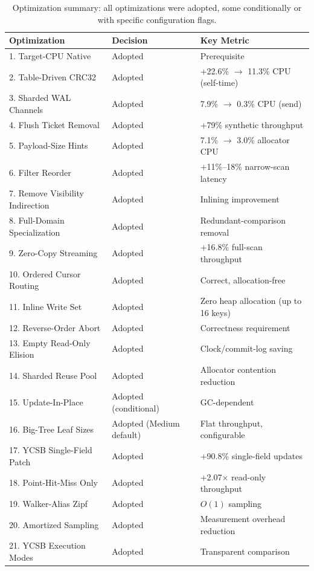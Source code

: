 \documentclass[11pt]{article}
\begin{document}
\begin{table}[h]
\centering
\small
\begin{tabular}{lll}
\toprule
\textbf{Optimization} & \textbf{Decision} & \textbf{Key Metric} \\
\midrule
1. Target-CPU Native & Adopted & Prerequisite \\
2. Table-Driven CRC32 & Adopted & +22.6\% $\to$ 11.3\% CPU (self-time) \\
3. Sharded WAL Channels & Adopted & 7.9\% $\to$ 0.3\% CPU (send) \\
4. Flush Ticket Removal & Adopted & +79\% synthetic throughput \\
5. Payload-Size Hints & Adopted & 7.1\% $\to$ 3.0\% allocator CPU \\
6. Filter Reorder & Adopted & +11\%--18\% narrow-scan latency \\
7. Remove Visibility Indirection & Adopted & Inlining improvement \\
8. Full-Domain Specialization & Adopted & Redundant-comparison removal \\
9. Zero-Copy Streaming & Adopted & +16.8\% full-scan throughput \\
10. Ordered Cursor Routing & Adopted & Correct, allocation-free \\
11. Inline Write Set & Adopted & Zero heap allocation (up to 16 keys) \\
12. Reverse-Order Abort & Adopted & Correctness requirement \\
13. Empty Read-Only Elision & Adopted & Clock/commit-log saving \\
14. Sharded Reuse Pool & Adopted & Allocator contention reduction \\
15. Update-In-Place & Adopted (conditional) & GC-dependent \\
16. Big-Tree Leaf Sizes & Adopted (Medium default) & Flat throughput, configurable \\
17. YCSB Single-Field Patch & Adopted & +90.8\% single-field updates \\
18. Point-Hit-Miss Only & Adopted & +2.07$\times$ read-only throughput \\
19. Walker-Alias Zipf & Adopted & $O(1)$ sampling \\
20. Amortized Sampling & Adopted & Measurement overhead reduction \\
21. YCSB Execution Modes & Adopted & Transparent comparison \\
\bottomrule
\end{tabular}
\caption{Optimization summary: all optimizations were adopted, some conditionally
or with specific configuration flags.}
\label{tab:opt_summary}
\end{table}
\end{document}
